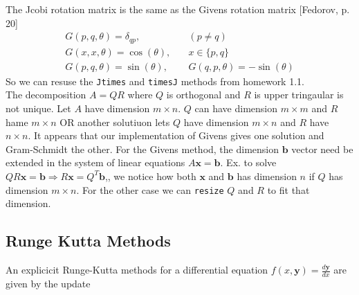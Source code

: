 \documentclass{article}
\begin{document}
The Jcobi rotation matrix is the same as the Givens rotation matrix [Fedorov, p. 20]
\begin{align}
	G(p, q, \theta) = \delta_{qp},&\quad(p \neq q)\\
	G(x, x, \theta) = \cos(\theta),& \quad x\in \{p, q\}\\
	G(p, q, \theta) = \sin(\theta), & \quad G(q, p, \theta) = -\sin(\theta) \textbf{}
\end{align}
So we can resuse the \texttt{Jtimes} and \texttt{timesJ} methods from homework 1.1. \\

The decomposition $A=QR$ where $Q$ is orthogonal and $R$ is upper tringaular is not unique. Let $A$ have dimension $m\times n$. $Q$ can have dimension $m\times m$ and $R$ hame $m\times n$ OR another solutiuon lets $Q$ have dimension $m\times n$ and $R$ have $n\times n$. It appears that our implementation of Givens gives one solution and Gram-Schmidt the other. For the Givens method, the dimension $\pmb b$ vector need be extended
in the system of linear equations $A\pmb x = \pmb b$. Ex. to solve $QR\pmb x = \pmb b \Rightarrow R\pmb x = Q^T\pmb b$,, we notice how both $\pmb x$ and $\pmb b$ has dimension $n$ if $Q$ has dimension $m\times n$. For the other case we can \texttt{resize} $Q$ and $R$ to fit that dimension.

\subsection{Runge Kutta Methods}
An explicicit Runge-Kutta methods for a differential equation $f(x, \pmb y) = \frac{d \pmb y}{dx}$ are given by the update 
\end{document}
